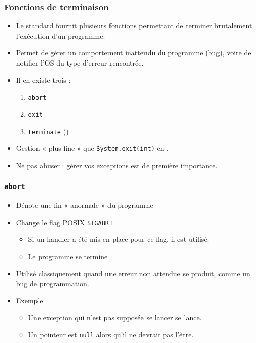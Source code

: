 \begin{frame}
\frametitle{Fonctions de terminaison}
\begin{itemize}[<+->]
\item Le standard fournit plusieurs fonctions permettant de terminer brutalement l'exécution d'un programme.
\item Permet de gérer un comportement inattendu du programme (bug), voire de notifier l'OS du type d'erreur rencontrée.
\item Il en existe trois :
	\begin{enumerate}
	\item \texttt{abort}
	\item \texttt{exit}
	\item \texttt{terminate} ()
	\end{enumerate}
\item Gestion « plus fine » que \texttt{System.exit(int)} en \java.
\item Ne pas abuser : gérer vos exceptions est de première importance.
\end{itemize}
\end{frame}

\begin{frame}
\frametitle{\texttt{abort}}
\begin{itemize}[<+->]
\item Dénote une fin « anormale » du programme
\item Change le flag POSIX \texttt{SIGABRT}
	\begin{itemize}
	\item Si un handler a été mis en place pour ce flag, il est utilisé.
	\item Le programme se termine
	\end{itemize}
\item Utilisé classiquement quand une erreur non attendue se produit, comme un bug de programmation.
\item Exemple
	\begin{itemize}
	\item Une exception qui n'est pas supposée se lancer se lance.
	\item Un pointeur est \texttt{null} alors qu'il ne devrait pas l'être.
	\end{itemize}
\end{itemize}
\end{frame}

